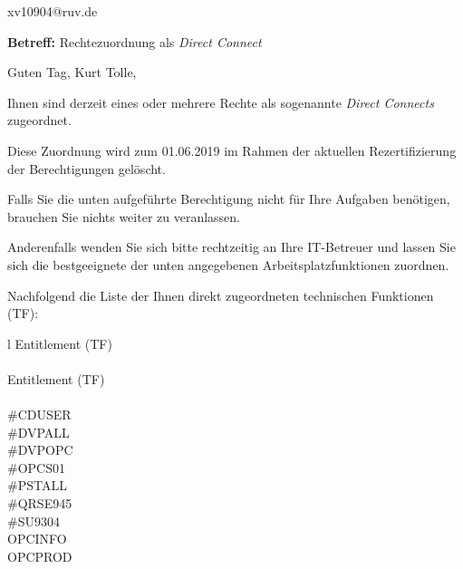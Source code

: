 \documentclass[a4paper,landscape,12pt]{letter}
\begin{document}
\begin{letter}{xv10904@ruv.de\hfill \break}
\begin{normalsize}
	\opening{\textbf{Betreff:} Rechtezuordnung als \emph{Direct Connect}}
	\begin{normalsize} \hfill
	\end{normalsize}

	\begin{normalsize}
		Guten Tag, 
	Kurt Tolle, \hfill \break
	\end{normalsize}
	\end{normalsize}
	
\begin{normalsize}
	Ihnen sind derzeit eines oder mehrere Rechte als sogenannte \emph{Direct Connects} zugeordnet.
	
	Diese Zuordnung wird zum 01.06.2019 im Rahmen der aktuellen Rezertifizierung der Berechtigungen gelöscht.
	
	Falls Sie die unten aufgeführte Berechtigung nicht für Ihre Aufgaben benötigen, 
	brauchen Sie nichts weiter zu veranlassen.
	
	Anderenfalls wenden Sie sich bitte rechtzeitig an Ihre IT-Betreuer 
	und lassen Sie sich die bestgeeignete der unten angegebenen Arbeitsplatzfunktionen zuordnen.
	\end{normalsize}
	
\begin{normalsize}
	Nachfolgend die Liste der Ihnen direkt zugeordneten technischen Funktionen (TF):

	\begin{longtable}{l}
		Entitlement (TF) \\ \hline
		\endfirsthead
		\\\hline
		Entitlement (TF) \\ \hline
		\endhead %
		\multicolumn{1}{r@{}}{Fortsetzung \ldots}\\
		\endfoot
		\hline
		\endlastfoot
	\#CDUSER\\\#DVPALL\\\#DVPOPC\\\#OPCS01\\\#PSTALL\\\#QRSE945\\\#SU9304\\OPCINFO\\OPCPROD\\
	\end{longtable}
	\end{normalsize}
	

\end{letter}
\end{document}
